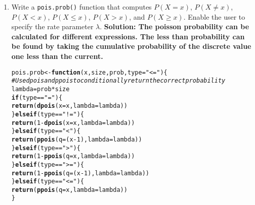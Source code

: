\documentclass{article}\usepackage[]{graphicx}\usepackage[]{xcolor}
\makeatletter
\newcommand{\hlnum}[1]{\textcolor[rgb]{0.686,0.059,0.569}{#1}}%
\newcommand{\hlsng}[1]{\textcolor[rgb]{0.192,0.494,0.8}{#1}}%
\newcommand{\hlcom}[1]{\textcolor[rgb]{0.678,0.584,0.686}{\textit{#1}}}%
\newcommand{\hlopt}[1]{\textcolor[rgb]{0,0,0}{#1}}%
\newcommand{\hldef}[1]{\textcolor[rgb]{0.345,0.345,0.345}{#1}}%
\newcommand{\hlkwa}[1]{\textcolor[rgb]{0.161,0.373,0.58}{\textbf{#1}}}%
\newcommand{\hlkwb}[1]{\textcolor[rgb]{0.69,0.353,0.396}{#1}}%
\newcommand{\hlkwc}[1]{\textcolor[rgb]{0.333,0.667,0.333}{#1}}%
\newcommand{\hlkwd}[1]{\textcolor[rgb]{0.737,0.353,0.396}{\textbf{#1}}}%
\newenvironment{kframe}{%
 \def\at@end@of@kframe{}%
 \ifinner\ifhmode%
  \def\at@end@of@kframe{\end{minipage}}%
  \begin{minipage}{\columnwidth}%
 \fi\fi%
 \def\FrameCommand##1{\hskip\@totalleftmargin \hskip-\fboxsep
 \colorbox{shadecolor}{##1}\hskip-\fboxsep
     \hskip-\linewidth \hskip-\@totalleftmargin \hskip\columnwidth}%
 \MakeFramed {\advance\hsize-\width
   \@totalleftmargin\z@ \linewidth\hsize
   \@setminipage}}%
 {\par\unskip\endMakeFramed%
 \at@end@of@kframe}
\newenvironment{knitrout}{}{} %
\makeatother
\begin{document}
  \begin{enumerate}
    \item Write a \texttt{pois.prob()} function that computes $P(X=x)$, 
    $P(X \neq x)$, $P(X<x)$, $P(X \leq x)$, $P(X > x)$, and $P(X \geq x).$ Enable the user to specify the rate parameter $\lambda$.
\textbf{Solution: The poisson probability can be calculated for different expressions. The less than probability can be found by taking the cumulative probability of the discrete value one less than the current. }
\begin{knitrout}\scriptsize
{}\color{fgcolor}\begin{kframe}
\begin{alltt}
\hldef{pois.prob} \hlkwb{<-} \hlkwa{function}\hldef{(}\hlkwc{x}\hldef{,} \hlkwc{size}\hldef{,} \hlkwc{prob}\hldef{,} \hlkwc{type}\hldef{=}\hlsng{"<="}\hldef{)\{}
  \hlcom{# Use dpois and ppois to conditionally return the correct probability}
  \hldef{lambda} \hlkwb{=} \hldef{prob}\hlopt{*} \hldef{size}
  \hlkwa{if}\hldef{(type} \hlopt{==} \hlsng{"="}\hldef{)\{}
    \hlkwd{return}\hldef{(}\hlkwd{dpois}\hldef{(}\hlkwc{x}\hldef{=x,} \hlkwc{lambda} \hldef{= lambda))}
  \hldef{\}}\hlkwa{else if}\hldef{(type} \hlopt{==} \hlsng{"!="}\hldef{)\{}
    \hlkwd{return}\hldef{(}\hlnum{1} \hlopt{-} \hlkwd{dpois}\hldef{(}\hlkwc{x}\hldef{=x,} \hlkwc{lambda} \hldef{= lambda))}
  \hldef{\}}\hlkwa{else if}\hldef{(type} \hlopt{==} \hlsng{"<"}\hldef{)\{}
    \hlkwd{return}\hldef{(}\hlkwd{ppois}\hldef{(}\hlkwc{q}\hldef{=(x}\hlopt{-}\hlnum{1}\hldef{),} \hlkwc{lambda} \hldef{= lambda))}
  \hldef{\}}\hlkwa{else if}\hldef{(type} \hlopt{==} \hlsng{">"}\hldef{)\{}
    \hlkwd{return}\hldef{(}\hlnum{1} \hlopt{-} \hlkwd{ppois}\hldef{(}\hlkwc{q}\hldef{=x,} \hlkwc{lambda} \hldef{= lambda))}
  \hldef{\}}\hlkwa{else if}\hldef{(type} \hlopt{==} \hlsng{">="}\hldef{)\{}
    \hlkwd{return}\hldef{(}\hlnum{1} \hlopt{-} \hlkwd{ppois}\hldef{(}\hlkwc{q}\hldef{=(x}\hlopt{-}\hlnum{1}\hldef{),} \hlkwc{lambda} \hldef{= lambda))}
  \hldef{\}}\hlkwa{else if}\hldef{(type} \hlopt{==} \hlsng{"<="}\hldef{)\{}
    \hlkwd{return}\hldef{(}\hlkwd{ppois}\hldef{(}\hlkwc{q}\hldef{=x,} \hlkwc{lambda} \hldef{= lambda))}
  \hldef{\}}


\end{alltt}
\end{kframe}
\end{knitrout}
\end{enumerate}
\end{document}

